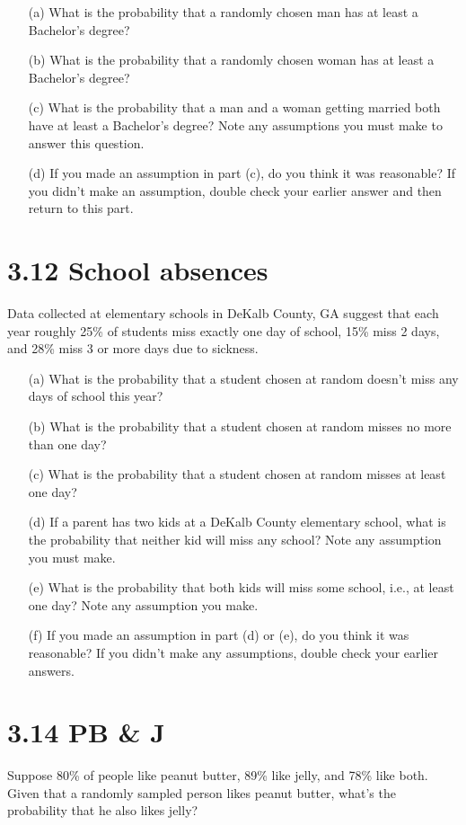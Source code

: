 \documentclass{article}
\begin{document}
\begin{enumerate}
    \item[(a)] What is the probability that a randomly chosen man has at least a Bachelor's degree?
    \item[(b)] What is the probability that a randomly chosen woman has at least a Bachelor's degree?
    \item[(c)] What is the probability that a man and a woman getting married both have at least a Bachelor's degree? Note any assumptions you must make to answer this question.
    \item[(d)] If you made an assumption in part (c), do you think it was reasonable? If you didn't make an assumption, double check your earlier answer and then return to this part.
\end{enumerate}

\section*{3.12 School absences}
Data collected at elementary schools in DeKalb County, GA suggest that each year roughly 25\% of students miss exactly one day of school, 15\% miss 2 days, and 28\% miss 3 or more days due to sickness.
\begin{enumerate}
    \item[(a)] What is the probability that a student chosen at random doesn't miss any days of school this year?
    \item[(b)] What is the probability that a student chosen at random misses no more than one day?
    \item[(c)] What is the probability that a student chosen at random misses at least one day?
    \item[(d)] If a parent has two kids at a DeKalb County elementary school, what is the probability that neither kid will miss any school? Note any assumption you must make.
    \item[(e)] What is the probability that both kids will miss some school, i.e., at least one day? Note any assumption you make.
    \item[(f)] If you made an assumption in part (d) or (e), do you think it was reasonable? If you didn't make any assumptions, double check your earlier answers.
\end{enumerate}

\section*{3.14 PB \& J}
Suppose 80\% of people like peanut butter, 89\% like jelly, and 78\% like both. Given that a randomly sampled person likes peanut butter, what's the probability that he also likes jelly?
\end{document}

